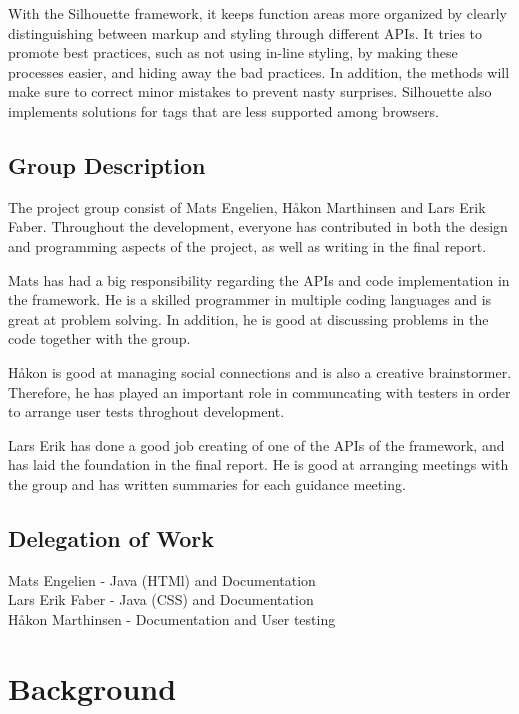\documentclass[12pt]{article}
\begin{document}
With the Silhouette framework, it keeps function areas more organized by clearly distinguishing between markup and styling through different APIs. It tries to promote best practices, such as not using in-line styling, by making these processes easier, and hiding away the bad practices. In addition, the methods will make sure to correct minor mistakes to prevent nasty surprises. Silhouette also implements solutions for tags that are less supported among browsers. 

    \subsection{Group Description}
    
    The project group consist of Mats Engelien, Håkon Marthinsen and Lars Erik Faber. Throughout the development, everyone has contributed in both the design and programming aspects of the project, as well as writing in the final report. 

    Mats has had a big responsibility regarding the APIs and code implementation in the framework. He is a skilled programmer in multiple coding languages and is great at problem solving. In addition, he is good at discussing problems in the code together with the group.

    Håkon is good at managing social connections and is also a creative brainstormer. Therefore, he has played an important role in communcating with testers in order to arrange user tests throghout development.

    Lars Erik has done a good job creating of one of the APIs of the framework, and has laid the foundation in the final report. He is good at arranging meetings with the group and has written summaries for each guidance meeting.


    \subsection{Delegation of Work}

    Mats Engelien - Java (HTMl) and Documentation\\
    Lars Erik Faber - Java (CSS) and Documentation\\
    Håkon Marthinsen - Documentation and User testing

\section{Background}
\end{document}
